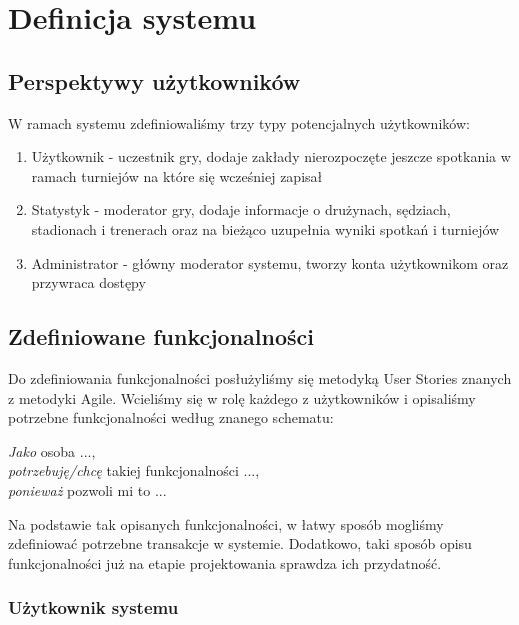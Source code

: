\documentclass{mwrep}[15pt]
\begin{document}
\chapter{Definicja systemu}

\section{Perspektywy użytkowników}
W ramach systemu zdefiniowaliśmy trzy typy potencjalnych użytkowników: \\
\begin{enumerate}
    \item Użytkownik - uczestnik gry, dodaje zakłady nierozpoczęte jeszcze spotkania w
    ramach turniejów na które się wcześniej zapisał\\ 

    \item Statystyk - moderator gry, dodaje informacje o drużynach, sędziach, stadionach i trenerach
    oraz na bieżąco uzupełnia wyniki spotkań i turniejów \\ 

    \item Administrator - główny moderator systemu, tworzy konta użytkownikom oraz przywraca dostępy \\
    
\end{enumerate}

\section{Zdefiniowane funkcjonalności}
Do zdefiniowania funkcjonalności posłużyliśmy się metodyką User Stories znanych z metodyki Agile. Wcieliśmy się 
w rolę każdego z użytkowników i opisaliśmy potrzebne funkcjonalności według znanego schematu:

\begin{center}
    \emph{Jako} osoba ..., \\ \emph{potrzebuję/chcę} takiej funkcjonalności ...,\\  \emph{ponieważ} pozwoli mi to ...  
\end{center}

Na podstawie tak opisanych funkcjonalności, w łatwy sposób mogliśmy zdefiniować potrzebne transakcje w systemie. Dodatkowo,
taki sposób opisu funkcjonalności już na etapie projektowania sprawdza ich przydatność.

\subsection{Użytkownik systemu}
\end{document}

